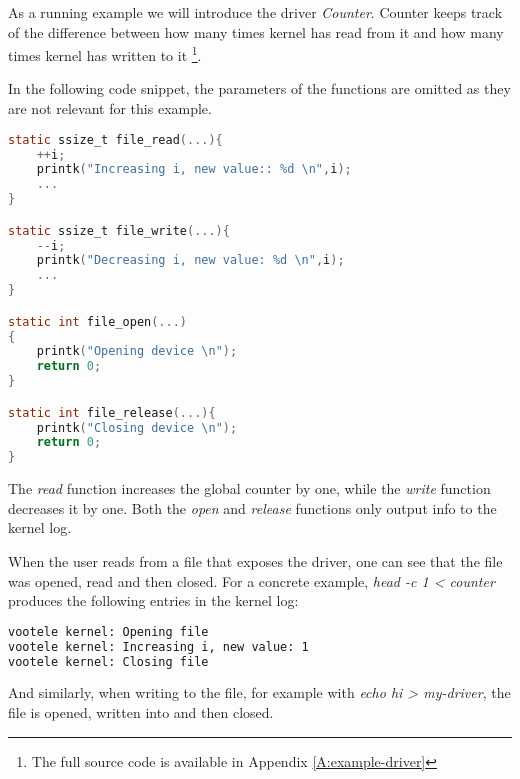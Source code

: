\documentclass[..thesis.tex]{subfiles}
\begin{document}
As a running example we will introduce the driver \textit{Counter}. Counter keeps track of the difference between how many times kernel has read from it and how many times kernel has written to it \footnote{The full source code is available in Appendix \ref{A:example-driver}}.

In the following code snippet, the parameters of the functions are omitted as they are not relevant for this example.



\begin{lstlisting}[language=C,style=def]
static ssize_t file_read(...){
    ++i;
    printk("Increasing i, new value:: %d \n",i);
    ...
}

static ssize_t file_write(...){
    --i;
    printk("Decreasing i, new value: %d \n",i);
    ...
}

static int file_open(...)
{
    printk("Opening device \n");
    return 0;
}

static int file_release(...){
    printk("Closing device \n");
    return 0;
}


\end{lstlisting}


The \textit{read} function increases the global counter by one, while the \textit{write} function decreases it by one. Both the \textit{open} and \textit{release} functions only output info to the kernel log.

When the user reads from a file that exposes the driver, one can see that the file was opened, read and then closed. For a concrete example,
\textit{head -c 1 < counter} produces the following entries in the kernel log:

\begin{lstlisting}[language=sh,style=def]
vootele kernel: Opening file 
vootele kernel: Increasing i, new value: 1 
vootele kernel: Closing file 
\end{lstlisting}

And similarly, when writing to the file, for example with \textit{echo hi > my-driver}, the file is opened, written into and then closed.
\end{document}
